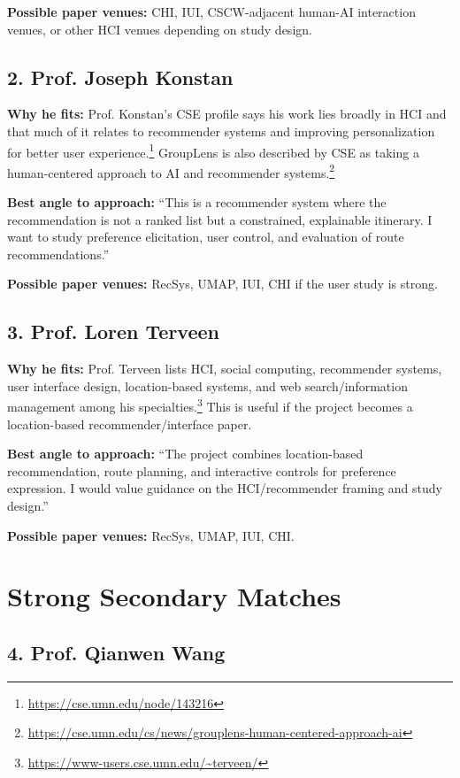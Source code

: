 \documentclass[11pt,a4paper]{article}
\begin{document}
\noindent \textbf{Possible paper venues:} CHI, IUI, CSCW-adjacent human-AI interaction venues, or other HCI venues depending on study design.

\subsection*{2. Prof. Joseph Konstan}

\noindent \textbf{Why he fits:} Prof. Konstan's CSE profile says his work lies broadly in HCI and that much of it relates to recommender systems and improving personalization for better user experience.\footnote{\url{https://cse.umn.edu/node/143216}} GroupLens is also described by CSE as taking a human-centered approach to AI and recommender systems.\footnote{\url{https://cse.umn.edu/cs/news/grouplens-human-centered-approach-ai}}

\noindent \textbf{Best angle to approach:} ``This is a recommender system where the recommendation is not a ranked list but a constrained, explainable itinerary. I want to study preference elicitation, user control, and evaluation of route recommendations.''

\noindent \textbf{Possible paper venues:} RecSys, UMAP, IUI, CHI if the user study is strong.

\subsection*{3. Prof. Loren Terveen}

\noindent \textbf{Why he fits:} Prof. Terveen lists HCI, social computing, recommender systems, user interface design, location-based systems, and web search/information management among his specialties.\footnote{\url{https://www-users.cse.umn.edu/~terveen/}} This is useful if the project becomes a location-based recommender/interface paper.

\noindent \textbf{Best angle to approach:} ``The project combines location-based recommendation, route planning, and interactive controls for preference expression. I would value guidance on the HCI/recommender framing and study design.''

\noindent \textbf{Possible paper venues:} RecSys, UMAP, IUI, CHI.

\section*{Strong Secondary Matches}

\subsection*{4. Prof. Qianwen Wang}
\end{document}
